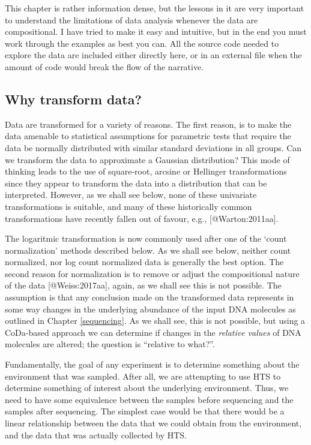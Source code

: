 \documentclass[
  onecolumn]{article}
\begin{document}
This chapter is rather information dense, but the lessons in it are very important to understand the limitations of data analysis whenever the data are compositional. I have tried to make it easy and intuitive, but in the end you must work through the examples as best you can. All the source code needed to explore the data are included either directly here, or in an external file when the amount of code would break the flow of the narrative.

\hypertarget{why-transform-data}{%
\subsection{Why transform data?}\label{why-transform-data}}

Data are transformed for a variety of reasons. The first reason, is to make the data amenable to statistical assumptions for parametric tests that require the data be normally distributed with similar standard deviations in all groups. Can we transform the data to approximate a Gaussian distribution? This mode of thinking leads to the use of square-root, arcsine or Hellinger transformations since they appear to transform the data into a distribution that can be interpreted. However, as we shall see below, none of these univariate transformations is suitable, and many of these historically common transformations have recently fallen out of favour, e.g., {[}@Warton:2011aa{]}.

The logaritmic transformation is now commonly used after one of the `count normalization' methods described below. As we shall see below, neither count normalized, nor log count normalized data is generally the best option. The second reason for normalization is to remove or adjust the compositional nature of the data {[}@Weiss:2017aa{]}, again, as we shall see this is not possible. The assumption is that any conclusion made on the transformed data represents in some way changes in the underlying abundance of the input DNA molecules as outlined in Chapter \ref{sequencing}. As we shall see, this is not possible, but using a CoDa-based approach we can determine if changes in the \emph{relative values} of DNA molecules are altered; the question is ``relative to what?''.

Fundamentally, the goal of any experiment is to determine something about the environment that was sampled. After all, we are attempting to use HTS to determine something of interest about the underlying environment. Thus, we need to have some equivalence between the samples before sequencing and the samples after sequencing. The simplest case would be that there would be a linear relationship between the data that we could obtain from the environment, and the data that was actually collected by HTS.
\end{document}

